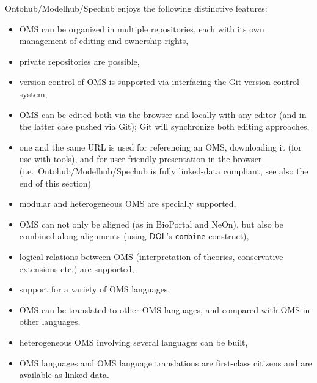 \documentclass[10pt, a4paper]{isov2}
\newcommand*{\syntax}[1]{\texttt{#1}}
\newcommand*{\DOL}{\ensuremath{\mathsf{DOL}}\xspace}
\begin{document}
Ontohub/Modelhub/Spechub enjoys the following distinctive features:
\begin{itemize}
  \item OMS can be organized in multiple repositories, each
     with its own management of editing and ownership rights,
  \item private repositories are possible,
  \item version control of OMS is supported via interfacing
   the Git version control system,
  \item OMS can be edited both via the browser and locally with any
  editor (and in the latter case pushed via Git); Git will synchronize both editing approaches,
  \item one and the same URL is used for referencing an OMS, downloading
     it (for use with tools), and for user-friendly presentation in
     the browser (i.e.\ Ontohub/Modelhub/Spechub is fully linked-data compliant,  see also the end of this section)
  \item modular and heterogeneous OMS are specially supported,
  \item OMS can not only be aligned (as in BioPortal and NeOn), but also be combined along alignments (using \DOL's \syntax{combine} construct),
  \item logical relations between OMS (interpretation of theories, conservative
  extensions etc.) are supported,
  \item support for a variety of OMS languages, 
  \item OMS can be translated to other OMS languages, and compared with
   OMS in other languages,
  \item heterogeneous OMS involving several languages can be built,
  \item OMS languages and OMS language translations are first-class
   citizens and are available as linked data.
\end{itemize}
\end{document}
